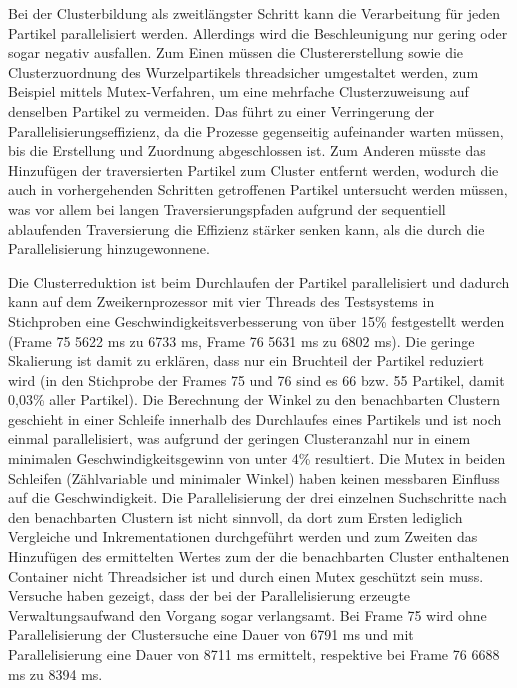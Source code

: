 Bei der Clusterbildung als zweitlängster Schritt kann die Verarbeitung für jeden Partikel parallelisiert werden. Allerdings wird die Beschleunigung nur gering oder sogar negativ ausfallen. Zum Einen müssen die Clustererstellung sowie die Clusterzuordnung des Wurzelpartikels threadsicher umgestaltet werden, zum Beispiel mittels Mutex-Verfahren, um eine mehrfache Clusterzuweisung auf denselben Partikel zu vermeiden. Das führt zu einer Verringerung der Parallelisierungseffizienz, da die Prozesse gegenseitig aufeinander warten müssen, bis die Erstellung und Zuordnung abgeschlossen ist. Zum Anderen müsste das Hinzufügen der traversierten Partikel zum Cluster entfernt werden, wodurch die auch in vorhergehenden Schritten getroffenen Partikel untersucht werden müssen, was vor allem bei langen Traversierungspfaden aufgrund der sequentiell ablaufenden Traversierung die Effizienz stärker senken kann, als die durch die Parallelisierung hinzugewonnene.

Die Clusterreduktion ist beim Durchlaufen der Partikel parallelisiert und dadurch kann auf dem Zweikernprozessor mit vier Threads des Testsystems in Stichproben eine Geschwindigkeitsverbesserung von über 15\% festgestellt werden (Frame 75 5622 ms zu 6733 ms, Frame 76 5631 ms zu 6802 ms). Die geringe Skalierung ist damit zu erklären, dass nur ein Bruchteil der Partikel reduziert wird (in den Stichprobe der Frames 75 und 76 sind es 66 bzw. 55 Partikel, damit 0,03\% aller Partikel). Die Berechnung der Winkel zu den benachbarten Clustern geschieht in einer Schleife innerhalb des Durchlaufes eines Partikels und ist noch einmal parallelisiert, was aufgrund der geringen Clusteranzahl nur in einem minimalen Geschwindigkeitsgewinn von unter 4\% resultiert. Die Mutex in beiden Schleifen (Zählvariable und minimaler Winkel) haben keinen messbaren Einfluss auf die Geschwindigkeit.
Die Parallelisierung der drei einzelnen Suchschritte nach den benachbarten Clustern ist nicht sinnvoll, da dort zum Ersten lediglich Vergleiche und Inkrementationen durchgeführt werden und zum Zweiten das Hinzufügen des ermittelten Wertes zum der die benachbarten Cluster enthaltenen Container nicht Threadsicher ist und durch einen Mutex geschützt sein muss. Versuche haben gezeigt, dass der bei der Parallelisierung erzeugte Verwaltungsaufwand den Vorgang sogar verlangsamt. Bei Frame 75 wird ohne Parallelisierung der Clustersuche eine Dauer von 6791 ms und mit Parallelisierung eine Dauer von 8711 ms ermittelt, respektive bei Frame 76 6688 ms zu 8394 ms.

